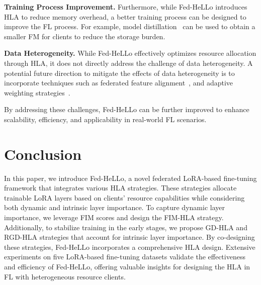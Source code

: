 \documentclass[lettersize,journal]{IEEEtran}
\begin{document}
{\textbf{Training Process Improvement.} Furthermore, while Fed-HeLLo introduces HLA to reduce memory overhead, a better training process can be designed to improve the FL process. For example, model distillation~\cite{li2019fedmd} can be used to obtain a smaller FM for clients to reduce the storage burden.}

{\textbf{Data Heterogeneity.} While Fed-HeLLo effectively optimizes resource allocation through HLA, it does not directly address the challenge of data heterogeneity. 
A potential future direction to mitigate the effects of data heterogeneity is to incorporate techniques such as federated feature alignment~\cite{yu2021fed2}, and adaptive weighting strategies~\cite{wu2021fast}.}

{By addressing these challenges, Fed-HeLLo can be further improved to enhance scalability, efficiency, and applicability in real-world FL scenarios.}


\section{Conclusion}
In this paper, we introduce Fed-HeLLo, a novel federated LoRA-based fine-tuning framework that integrates various HLA strategies.
These strategies allocate trainable LoRA layers based on clients' resource capabilities while considering both dynamic and intrinsic layer importance. 
To capture dynamic layer importance, we leverage FIM scores and design the FIM-HLA strategy. 
Additionally, to stabilize training in the early stages, 
we propose GD-HLA and RGD-HLA strategies that account for intrinsic layer importance. By co-designing these strategies, Fed-HeLLo incorporates a comprehensive HLA design.
Extensive experiments on five LoRA-based fine-tuning datasets validate the effectiveness and efficiency of Fed-HeLLo, offering valuable insights for designing the HLA in FL with heterogeneous resource clients.




{
\small


}


\vfill
\end{document}
